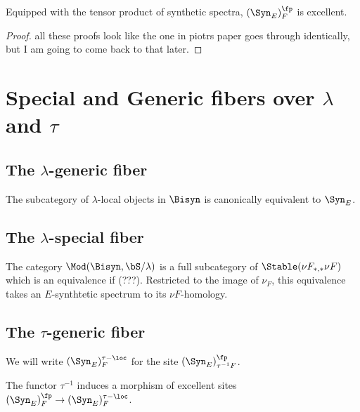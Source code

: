 \begin{lemma}
  Equipped with the tensor product of synthetic spectra, $(\Syn_E)_F^\fp$ is excellent.
\end{lemma}

\begin{proof}
  all these proofs look like the one in piotrs paper goes through identically, but I am going to come back to that later.
\end{proof}

\section{Special and Generic fibers over $\lambda$ and $\tau$}

\subsection{The $\lambda$-generic fiber}

\begin{theorem}
  The subcategory of $\lambda$-local objects in $\Bisyn$ is canonically equivalent to $\Syn_E$.
\end{theorem}

\subsection{The $\lambda$-special fiber}

\begin{theorem}
  The category $\Mod(\Bisyn, \bS/\lambda)$ is a full subcategory of $\Stable(\nu F_{*,*}\nu F)$ which is an equivalence if (???). Restricted to the image of $\nu_F$, this equivalence takes an $E$-synthtetic spectrum to its $\nu F$-homology.
\end{theorem}

\subsection{The $\tau$-generic fiber}

\begin{notation}
  We will write $(\Syn_E)^{\tau-\loc}_F$ for the site $(\Syn_E)_{\tau^{-1}F}^\fp$.
\end{notation}

\begin{lemma}
  The functor $\tau^{-1}$ induces a morphism of excellent sites $(\Syn_E)^\fp_{F}\to (\Syn_E)^{\tau-\loc}_F$.
\end{lemma}

